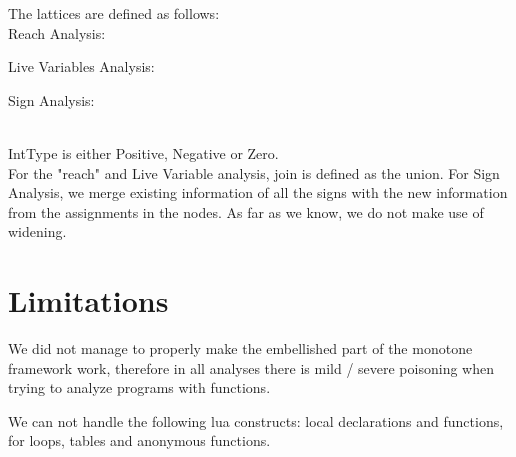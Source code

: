 \documentclass[10pt]{article}
\begin{document}
The lattices are defined as follows: \\ 
Reach Analysis: \\

Live Variables Analysis: \\


Sign Analysis: \\

\\
IntType is either Positive, Negative or Zero.\\

For the "reach" and Live Variable analysis, join is defined as the union. For Sign Analysis, we merge existing information of all the signs with the new information from the assignments in the nodes. As far as we know, we do not make use of widening.

\section{Limitations}
We did not manage to properly make the embellished part of the monotone framework work, therefore in all analyses there is mild / severe poisoning when trying to analyze programs with functions.

We can not handle the following lua constructs: local declarations and functions, for loops, tables and anonymous functions.
\end{document}
